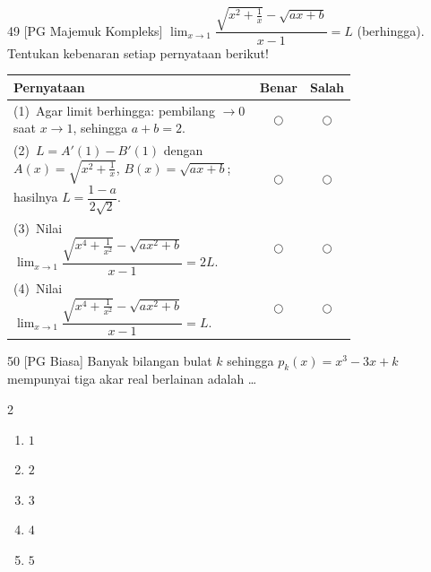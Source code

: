 \documentclass[11pt]{article}
\newenvironment{pilB}{%
  \par\smallskip\begin{multicols}{2}
  \begin{enumerate}[label=(\alph*),leftmargin=*,itemsep=1pt,topsep=3pt]}%
  {\end{enumerate}\end{multicols}}
\begin{document}
\begin{soal}{49 \normalfont\small[PG Majemuk Kompleks]}
$\displaystyle\lim_{x\to1}\dfrac{\sqrt{x^2+\frac{1}{x}}-\sqrt{ax+b}}{x-1}=L$ (berhingga).
Tentukan kebenaran setiap pernyataan berikut!

\par\smallskip
{\renewcommand{\arraystretch}{1.4}%
\begin{tabular}{@{}p{0.76\linewidth}cc@{}}
\hline\textbf{Pernyataan}&\textbf{Benar}&\textbf{Salah}\\\hline
(1)~Agar limit berhingga: pembilang $\to0$ saat $x\to1$, sehingga $a+b=2$.&$\bigcirc$&$\bigcirc$\\
(2)~$L=A'(1)-B'(1)$ dengan $A(x)=\sqrt{x^2+\frac1x}$, $B(x)=\sqrt{ax+b}$; hasilnya $L=\dfrac{1-a}{2\sqrt2}$.&$\bigcirc$&$\bigcirc$\\
(3)~Nilai $\displaystyle\lim_{x\to1}\dfrac{\sqrt{x^4+\frac{1}{x^2}}-\sqrt{ax^2+b}}{x-1}=2L$.&$\bigcirc$&$\bigcirc$\\
(4)~Nilai $\displaystyle\lim_{x\to1}\dfrac{\sqrt{x^4+\frac{1}{x^2}}-\sqrt{ax^2+b}}{x-1}=L$.&$\bigcirc$&$\bigcirc$\\\hline
\end{tabular}}
\end{soal}

\begin{soal}{50 \normalfont\small[PG Biasa]}
Banyak bilangan bulat $k$ sehingga $p_k(x)=x^3-3x+k$ mempunyai tiga akar
real berlainan adalah \ldots
\begin{pilB}
  \item $1$ \item $2$ \item $3$ \item $4$ \item $5$
\end{pilB}
\end{soal}
\end{document}
